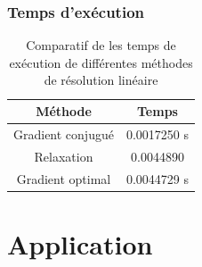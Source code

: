 \documentclass[a4paper,11pt]{article}
\begin{document}
\subsubsection{Temps d'exécution}

\begin{table}[h!]
  \begin{center}
    \begin{tabular}{|c|c|}
      \hline 
      Méthode & Temps \\
      \hline 
      \hline 
      Gradient conjugué & 0.0017250 s\\
      Relaxation & 0.0044890\\
      Gradient optimal & 0.0044729 s\\
      \hline 
    \end{tabular}
  \end{center}
  \caption{Comparatif de les temps de exécution de différentes méthodes de
    résolution linéaire}
\end{table}


\section{Application }

\begin{multicols}{2}
  
\end{multicols}
\end{document}
